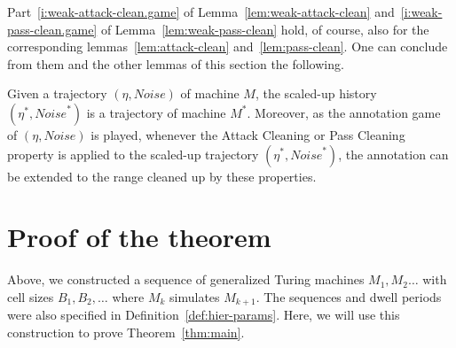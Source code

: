 \documentclass[11pt]{memoir}
\theoremstyle{definition} %
\def\B{B}
\newcommand{\Noise}{\mathit{Noise}}
\begin{document}



Part~\eqref{i:weak-attack-clean.game} of Lemma~\ref{lem:weak-attack-clean}
and~\eqref{i:weak-pass-clean.game} of Lemma~\ref{lem:weak-pass-clean} hold, of course,
also for the corresponding lemmas~\ref{lem:attack-clean} and~\ref{lem:pass-clean}.
One can conclude from them and the other lemmas of this section the following.

\begin{lemma}\label{lem:game}
  Given a trajectory \( (\eta,\Noise) \) of machine \( M \),
  the scaled-up history \( (\eta^{*},\Noise^{*})\)
  is a trajectory of machine \( M^{*} \).
  Moreover, as the annotation game of \( (\eta,\Noise) \) is played, whenever the
  Attack Cleaning or Pass Cleaning property is applied to the
  scaled-up trajectory \( (\eta^{*},\Noise^{*}) \), the annotation can be extended to the
  range cleaned up by these properties.
  
\end{lemma}

\section{Proof of the theorem}\label{sec:computation}

Above, we constructed a sequence of generalized Turing machines \( M_{1},M_{2}\dots \)
with cell sizes \( \B_{1},\B_{2},\dots \) where \( M_{k} \) simulates \( M_{k+1} \).
The sequences and dwell periods were also specified in Definition~\ref{def:hier-params}.
Here, we will use this construction to prove Theorem~\ref{thm:main}.
\end{document}
